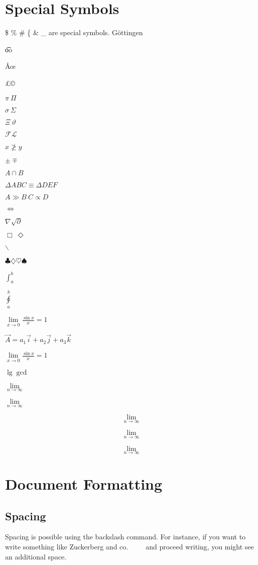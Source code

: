 \documentclass[10pt,a4paper]{article}
\begin{document}
\section{Special Symbols}

\$ \% \# \{ \& \_ are special symbols. G\"ottingen

\t{oo}

\AA \oe \dag \ddag

\pounds   \copyright

$\pi \ \Pi$

$\sigma \ \Sigma$

$ \Xi \ \vartheta$

$\mathcal{F} \mathcal{L}$

$ x \not \ge y$

$ \pm \mp $

$ A \cap B$

$ \Delta ABC \equiv \Delta DEF$

$ A \gg B \  C \propto D$

$ \Longleftrightarrow $

$ \nabla \surd \partial$

$ \Box \ \Diamond$

$ \backslash $

$ \clubsuit \diamondsuit \heartsuit \spadesuit$

$ \int^b_a $

$\displaystyle{\oint \limits^b_a}$

$ \displaystyle{\lim \limits_{x \to 0} \frac{\sin{x}}{x} = 1}$

$ \vec{A} = a_1\vec{i} + a_2\vec{j} + a_3\vec{k}$

$ \lim \limits_{x \to 0} \frac{\sin{x}}{x} = 1$

$\lg \gcd$

\( \lim \limits_{n \rightarrow \infty} \)

$ \lim \limits_{n \rightarrow \infty}$

$$ \lim \limits_{n \rightarrow \infty}$$

\[ \lim \limits_{n \rightarrow \infty} \]

$$ \lim_{n \rightarrow \infty} $$

\section{Document Formatting}

\subsection{Spacing}
Spacing is possible using the backslash command. For instance, if you want to write something like Zuckerberg and co.\ \ \ \ \ and proceed writing, you might see an additional space.
\end{document}
